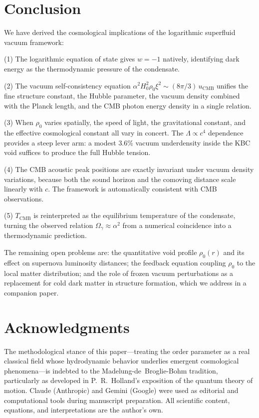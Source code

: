 \documentclass[12pt, a4paper]{article}
\newcommand{\Tcmb}{T_{\mathrm{CMB}}}
\begin{document}
\section{Conclusion}
\label{sec:conclusion}

We have derived the cosmological implications of the logarithmic superfluid vacuum framework:

(1) The logarithmic equation of state gives $w = -1$ natively, identifying dark energy as the thermodynamic pressure of the condensate.

(2) The vacuum self-consistency equation $\alpha^2 H_0^2 \rho_0\xi^2 \sim (8\pi/3)\,u_{\mathrm{CMB}}$ unifies the fine structure constant, the Hubble parameter, the vacuum density combined with the Planck length, and the CMB photon energy density in a single relation.

(3) When $\rho_0$ varies spatially, the speed of light, the gravitational constant, and the effective cosmological constant all vary in concert. The $\Lambda \propto c^4$ dependence provides a steep lever arm: a modest $3.6\%$ vacuum underdensity inside the KBC void suffices to produce the full Hubble tension.

(4) The CMB acoustic peak positions are exactly invariant under vacuum density variations, because both the sound horizon and the comoving distance scale linearly with $c$. The framework is automatically consistent with CMB observations.

(5) $\Tcmb$ is reinterpreted as the equilibrium temperature of the condensate, turning the observed relation $\Omega_\gamma \approx \alpha^2$ from a numerical coincidence into a thermodynamic prediction.

The remaining open problems are: the quantitative void profile $\rho_0(r)$ and its effect on supernova luminosity distances; the feedback equation coupling $\rho_0$ to the local matter distribution; and the role of frozen vacuum perturbations as a replacement for cold dark matter in structure formation, which we address in a companion paper.

\section*{Acknowledgments}

The methodological stance of this paper---treating the order parameter as a real classical field whose hydrodynamic behavior underlies emergent cosmological phenomena---is indebted to the Madelung-de~Broglie-Bohm tradition, particularly as developed in P.~R.~Holland's exposition of the quantum theory of motion. Claude (Anthropic) and Gemini (Google) were used as editorial and computational tools during manuscript preparation. All scientific content, equations, and interpretations are the author's own.
\end{document}

